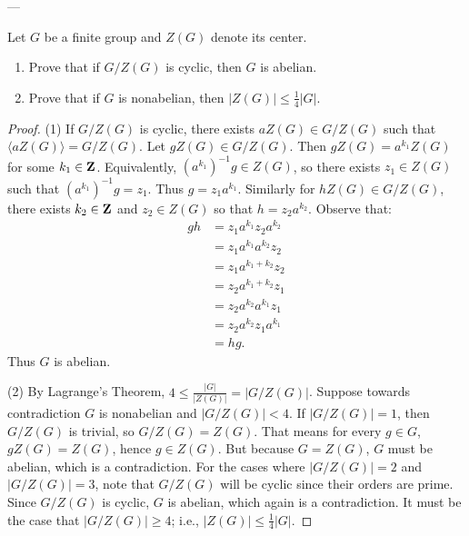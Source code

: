 \documentclass[11pt,twoside,openany]{memoir}
\begin{document}
    ---

    \begin{exercise}
        Let $G$ be a finite group and $Z(G)$ denote its center.
        \begin{enumerate}[label = (\arabic*),itemsep=1pt,topsep=3pt]
            \item Prove that if $G/Z(G)$ is cyclic, then $G$ is abelian.
            \item Prove that if $G$ is nonabelian, then $|Z(G)| \leq \frac{1}{4}|G|$.
        \end{enumerate}
    \end{exercise}
        {\color{blue} \begin{proof}
            (1) If $G/Z(G)$ is cyclic, there exists $aZ(G) \in G/Z(G)$ such that $\langle aZ(G) \rangle = G/Z(G)$. Let $gZ(G) \in G/Z(G)$. Then $gZ(G) = a^{k_1}Z(G)$ for some $k_1 \in \mathbf{Z}$. Equivalently, $(a^{k_1})^{-1}g \in Z(G)$, so there exists $z_1 \in Z(G)$ such that $(a^{k_1})^{-1}g = z_1$. Thus $g = z_1a^{k_1}$. Similarly for $hZ(G) \in G/Z(G)$, there exists $k_2 \in \mathbf{Z}$ and $z_2 \in Z(G)$ so that $h = z_2a^{k_2}$. Observe that:
                \begin{equation*}
                \begin{split}
                    gh 
                    & = z_1a^{k_1}z_2a^{k_2} \\
                    & = z_1 a^{k_1}a^{k_2}z_2 \\
                    & = z_1 a^{k_1 + k_2}z_2 \\
                    & = z_2 a^{k_1 + k_2}z_1 \\
                    & = z_2 a^{k_2}a^{k_1}z_1 \\
                    & = z_2a^{k_2}z_1a^{k_1} \\
                    & = hg.
                \end{split}
                \end{equation*}
            Thus $G$ is abelian. \nl
            
            \noindent (2) By Lagrange's Theorem, $4 \leq \frac{|G|}{|Z(G)|} = |G/Z(G)|$. Suppose towards contradiction $G$ is nonabelian and $|G/Z(G)| < 4$. If $|G/Z(G)| = 1$, then $G/Z(G)$ is trivial, so $G/Z(G) = Z(G)$. That means for every $g \in G$, $gZ(G) = Z(G)$, hence $g \in Z(G)$. But because $G = Z(G)$, $G$ must be abelian, which is a contradiction. For the cases where $|G/Z(G)| = 2$ and $|G/Z(G)| = 3$, note that $G/Z(G)$ will be cyclic since their orders are prime. Since $G/Z(G)$ is cyclic, $G$ is abelian, which again is a contradiction. It must be the case that $|G/Z(G)| \geq 4$; i.e., $|Z(G)| \leq \frac{1}{4}|G|$.
        \end{proof}}
\end{document}
